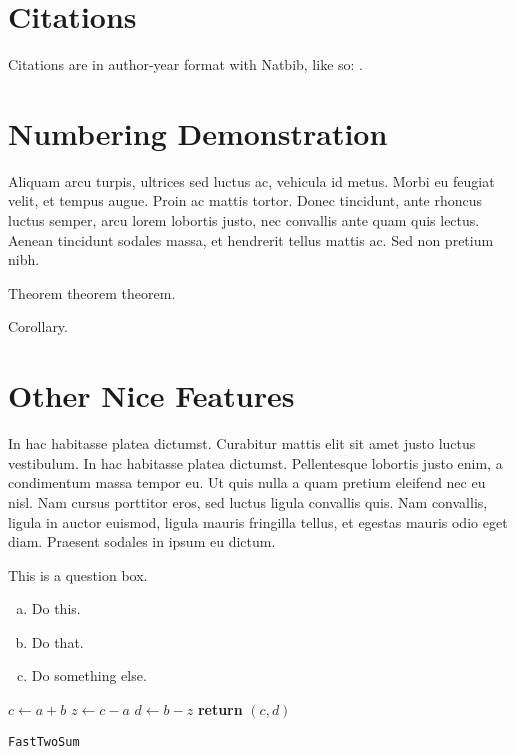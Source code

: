 \documentclass{article}
\begin{document}
\section{Citations}
Citations are in author-year format with Natbib, like so: \citep{lamport1994latex}.
\section{Numbering Demonstration}
Aliquam arcu turpis, ultrices sed luctus ac, vehicula id metus. Morbi eu feugiat velit, et tempus augue. Proin ac mattis tortor. Donec tincidunt, ante rhoncus luctus semper, arcu lorem lobortis justo, nec convallis ante quam quis lectus. Aenean tincidunt sodales massa, et hendrerit tellus mattis ac. Sed non pretium nibh.

\begin{theorem}
Theorem theorem theorem.
\end{theorem}
\begin{cor}
Corollary. 
\end{cor}


\section{Other Nice Features} %

In hac habitasse platea dictumst. Curabitur mattis elit sit amet justo luctus vestibulum. In hac habitasse platea dictumst. Pellentesque lobortis justo enim, a condimentum massa tempor eu. Ut quis nulla a quam pretium eleifend nec eu nisl. Nam cursus porttitor eros, sed luctus ligula convallis quis. Nam convallis, ligula in auctor euismod, ligula mauris fringilla tellus, et egestas mauris odio eget diam. Praesent sodales in ipsum eu dictum.

\begin{question}
	This is a question box.
	\begin{enumerate}[(a)]
		\item Do this.
		\item Do that.
		\item Do something else.
	\end{enumerate}
\end{question}
	
\begin{center}
	\begin{minipage}{0.5\linewidth}
		\begin{algorithm}[H]
			\medskip
			$c \leftarrow a + b$ \;
			$z \leftarrow c - a$ \;
			$d \leftarrow b - z$ \;
			{\bf return} $(c,d)$ \;
			\caption{\texttt{FastTwoSum}} 
			\label{alg:fastTwoSum}  
		\end{algorithm}
	\end{minipage}
\end{center}
\end{document}
